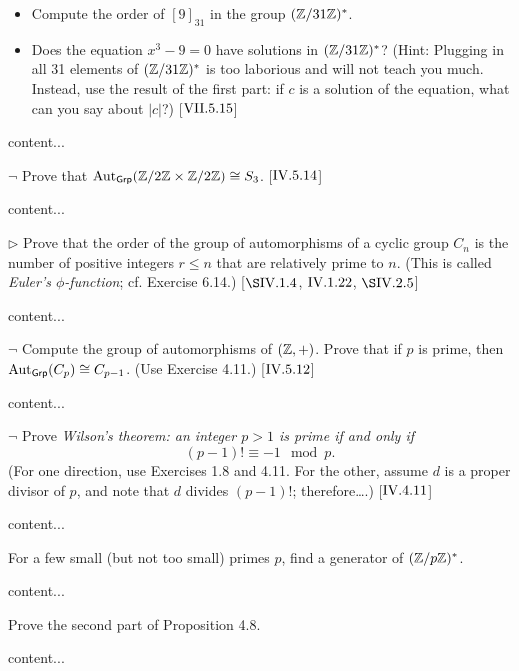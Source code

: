 \begin{exercise} %
	\begin{itemize}[wide]
		$\neg$
		\item Compute the order of $[9]_{31}$ in the group $(\mathbb{Z}/31\mathbb{Z})^*$.
		\item Does the equation $x^3- 9 = 0$ have solutions in $(\mathbb{Z}/31\mathbb{Z})^*$? (Hint: Plugging in all 31 elements of $(\mathbb{Z}/31\mathbb{Z})^*$ is too laborious and will not teach you much. Instead, use the result of the first part: if $c$ is a solution of the equation, what can you say about $|c|$?) [$\RNo{7}.5.15$]
	\end{itemize}
\end{exercise}
\begin{solution}
	content...
\end{solution}
\begin{exercise}
	$\neg$ Prove that $\operatorname{Aut}_{\textsf{Grp}}(\mathbb{Z}/2\mathbb{Z}\times \mathbb{Z}/2\mathbb{Z}) \cong S_3$. [$\RNo{4}.5.14$]
\end{exercise}
\begin{solution}
	content...
\end{solution}

\begin{exercise}
	$\triangleright$ Prove that the order of the group of automorphisms of a cyclic group $C_n$ is the number of positive integers $r\leq n$ that are relatively prime to $n$. (This is called \emph{Euler's $\phi$-function}; cf. Exercise 6.14.) [$\S\RNo{4}.1.4$, $\RNo{4}.1.22$, $\S\RNo{4}.2.5$]
\end{exercise}
\begin{solution}
	content...
\end{solution}

\begin{exercise}
	$\neg$ Compute the group of automorphisms of $(\mathbb{Z}, +)$. Prove that if $p$ is prime, then $\operatorname{Aut}_{\textsf{Grp}}(C_p)\cong C_{p-1}$. (Use Exercise 4.11.) [$\RNo{4}.5.12$]
\end{exercise}
\begin{solution}
	content...
\end{solution}

\begin{exercise}
	$\neg$ Prove \textit{Wilson's theorem: an integer $p>1$ is prime if and only if} 
	\[
		(p-1)! \equiv -1 \mod p.
	\]
	(For one direction, use Exercises 1.8 and 4.11. For the other, assume $d$ is a proper divisor of $p$, and note that $d$ divides $(p-1)!$; therefore\ldots .) [$\RNo{4}.4.11$]
\end{exercise}
\begin{solution}
	content...
\end{solution}

\begin{exercise}
	For a few small (but not too small) primes $p$, find a generator of $(\mathbb{Z}/p\mathbb{Z})^{*}$.
\end{exercise}
\begin{solution}
	content...
\end{solution}

\begin{exercise}
	Prove the second part of Proposition 4.8.
\end{exercise}
\begin{solution}
	content...
\end{solution}